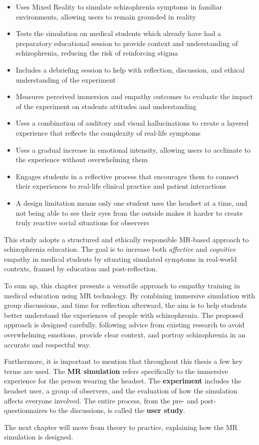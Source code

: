 \begin{itemize}
    \item Uses Mixed Reality to simulate schizophrenia symptoms in familiar environments, allowing users to remain grounded in reality
    \item Tests the simulation on medical students which already have had a preparatory educational session to provide context and understanding of schizophrenia, reducing the risk of reinforcing stigma
    \item Includes a debriefing session to help with reflection, discussion, and ethical understanding of the experiment
    \item Measures perceived immersion and empathy outcomes to evaluate the impact of the experiment on students attitudes and understanding
    \item Uses a combination of auditory and visual hallucinations to create a layered experience that reflects the complexity of real-life symptoms
    \item Uses a gradual increase in emotional intensity, allowing users to acclimate to the experience without overwhelming them
    \item Engages students in a reflective process that encourages them to connect their experiences to real-life clinical practice and patient interactions
    \item A design limitation means only one student uses the headset at a time, and not being able to see their eyes from the outside makes it harder to create truly reactive social situations for observers
\end{itemize}

This study adopts a structured and ethically responsible MR-based approach to schizophrenia education. The goal is to increase both \textit{affective} and \textit{cognitive} empathy in medical students by situating simulated symptoms in real-world contexts, framed by education and post-reflection. 

\vspace{1em}

To sum up, this chapter presents a versatile approach to empathy training in medical education using MR technology. By combining immersive simulation with group discussions, and time for reflection afterward, the aim is to help students better understand the experiences of people with schizophrenia. The proposed approach is designed carefully, following advice from existing research to avoid overwhelming emotions, provide clear context, and portray schizophrenia in an accurate and respectful way.

Furthermore, it is important to mention that throughout this thesis a few key terms are used. The \textbf{MR simulation} refers specifically to the immersive experience for the person wearing the headset. The \textbf{experiment} includes the headset user, a group of observers, and the evaluation of how the simulation affects everyone involved. The entire process, from the pre- and post-questionnaires to the discussions, is called the \textbf{user study}.

\vspace{1em}

The next chapter will move from theory to practice, explaining how the MR simulation is designed.
